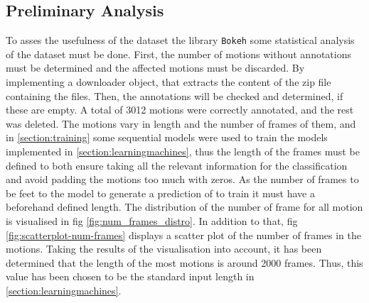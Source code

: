 \subsection{Preliminary Analysis}
To asses the usefulness of the dataset the library \texttt{Bokeh} some statistical analysis of the dataset must be done. First, the number of motions without annotations must be determined and the affected motions must be discarded. By implementing a downloader object, that extracts the content of the zip file containing the files. Then, the annotations will be checked and determined, if these are empty. A total of 3012 motions were correctly annotated, and the rest was deleted.\newline
The motions vary in length and the number of frames of them, and in \ref{section:training} some sequential models were used to train the models implemented in \ref{section:learningmachines}, thus the length of the frames must be defined to both ensure taking all the relevant information for the classification and avoid padding the motions too much with zeros. As the number of frames to be feet to the model to generate a prediction of to train it must have a beforehand defined length. The distribution of the number of frame for all motion is visualised in fig \ref{fig:num_frames_distro}. In addition to that, fig \ref{fig:scatterplot-num-frames} displays a scatter plot of the number of frames in the motions. Taking the results of the visualisation into account, it has been determined that the length of the most motions is around 2000 frames. Thus, this value has been chosen to be the standard input length in \ref{section:learningmachines}.
